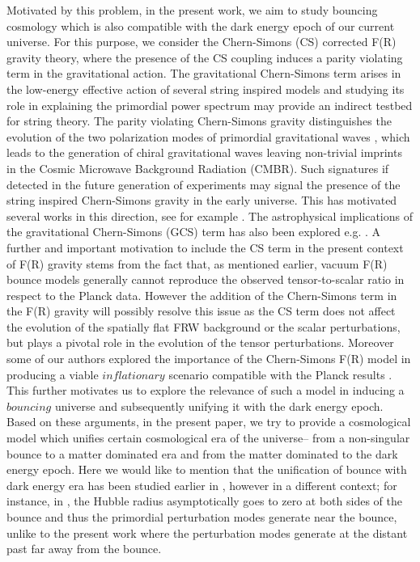 \documentclass{article}
\begin{document}
Motivated by this problem, in the present work, we aim to study bouncing cosmology which is also compatible with the dark energy epoch of our 
current universe. For this purpose, we consider the Chern-Simons (CS) corrected F(R) gravity theory, where the presence of the CS coupling induces a 
parity violating term in the gravitational action. The gravitational Chern-Simons term arises in the low-energy effective action of several string inspired 
models \cite{Green:1984sg,Antoniadis:1992sa} and studying its role in explaining 
the primordial power spectrum may provide an indirect testbed for string theory. 
The parity violating Chern-Simons gravity distinguishes the evolution of the two polarization modes of primordial gravitational 
waves \cite{Hwang:2005hb,Choi:1999zy}, which leads to the generation of 
chiral gravitational waves leaving non-trivial imprints in the Cosmic 
Microwave Background Radiation (CMBR). Such signatures if detected in the future generation of experiments may signal the presence of the string 
inspired Chern-Simons gravity in the early universe. This has motivated several works in this direction, see for example 
\cite{Satoh:2007gn,Satoh:2008ck,Jackiw:2003pm,Lue:1998mq,Choi:1999zy,Haghani:2017yjk,Nishizawa:2018srh,Inomata:2018rin,Kamionkowski:1997av}. 
The astrophysical implications of the gravitational Chern-Simons (GCS) term has also been explored e.g. \cite{Wagle:2018tyk}.
A further and important motivation to include the CS term in the present context of F(R) gravity 
stems from the fact that, as mentioned earlier, vacuum F(R) bounce models generally cannot reproduce the observed tensor-to-scalar ratio in 
respect to the Planck data. However the addition of the Chern-Simons term in the F(R) gravity will possibly 
resolve this issue as the CS term does not affect the evolution of the spatially flat FRW background or the scalar perturbations, 
but plays a pivotal role in the evolution of the tensor perturbations. Moreover some of our authors explored the 
importance of the Chern-Simons F(R) model in producing a viable $inflationary$ scenario compatible with the Planck results \cite{Odintsov:2019mlf}. 
This further motivates us to explore the relevance of such a 
model in inducing a $bouncing$ universe and subsequently unifying it with the dark energy epoch. Based on these arguments, in the present paper, 
we try to provide a cosmological model which unifies certain cosmological era of the universe-- from a non-singular bounce to a matter dominated 
era and from the matter dominated to the dark energy epoch. Here we would like to mention that the unification of bounce with dark energy era 
has been studied earlier in \cite{Odintsov:2020zct,Odintsov:2016tar,Cai:2016hea,Colin:2017dwv}, however in a different context; for instance, in 
\cite{Odintsov:2020zct}, 
the Hubble radius asymptotically goes to zero at 
both sides of the bounce and thus the primordial perturbation modes generate near the bounce, unlike to 
the present work where the perturbation modes generate at the distant past far away from the bounce.
\end{document}
